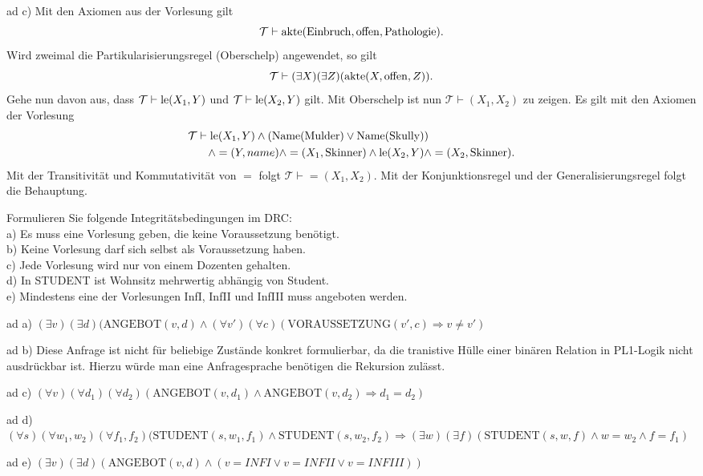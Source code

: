 \documentclass[12pt,a4paper]{amsart}
\begin{document}
\medskip

ad c) Mit den Axiomen aus der Vorlesung gilt
\[
\mathcal{T}\vdash \operatorname{akte}(\operatorname{Einbruch},\operatorname{offen},\operatorname{Pathologie}).
\]
Wird zweimal die Partikularisierungsregel (Oberschelp) angewendet, so gilt 
\[
\mathcal{T}\vdash(\exists X)(\exists Z)(\operatorname{akte}(X,\operatorname{offen},Z)).
\]
Gehe nun davon aus, dass $\mathcal{T}\vdash\operatorname{le}(X_1,Y)$ und $\mathcal{T}\vdash\operatorname{le}(X_2,Y)$ gilt. Mit Oberschelp ist nun $\mathcal{T}\vdash(X_1,X_2)$ zu zeigen.
Es gilt mit den Axiomen der Vorlesung
\begin{align*}
\mathcal{T} &\vdash \operatorname{le}(X_1,Y)\land(\operatorname{Name}(\operatorname{Mulder})\lor\operatorname{Name}(\operatorname{Skully}))\\
&\quad \land =(Y,name)\land =(X_1,\operatorname{Skinner})\land\operatorname{le}(X_2,Y)\land =(X_2,\operatorname{Skinner}).
\end{align*}
Mit der Transitivität und Kommutativität von $=$ folgt $\mathcal{T}\vdash=(X_1,X_2)$. Mit der Konjunktionsregel und der Generalisierungsregel folgt
die Behauptung.

\bigskip

\begin{aufgabe1}
Formulieren Sie folgende Integritätsbedingungen im DRC:\\
a) Es muss eine Vorlesung geben, die keine Voraussetzung benötigt.\\
b) Keine Vorlesung darf sich selbst als Voraussetzung haben.\\
c) Jede Vorlesung wird nur von einem Dozenten gehalten.\\
d) In STUDENT ist Wohnsitz mehrwertig abhängig von Student.\\
e) Mindestens eine der Vorlesungen InfI, InfII und InfIII muss angeboten werden.
\end{aufgabe1}

ad a) $(\exists v)(\exists d)(\mbox{ANGEBOT}(v,d)\land(\forall v')(\forall c)(\mbox{VORAUSSETZUNG}(v',c)\Rightarrow v\neq v')$\\

\medskip

ad b) Diese Anfrage ist nicht für beliebige Zustände konkret formulierbar, da die tranistive Hülle einer binären Relation in PL1-Logik nicht ausdrückbar ist. Hierzu würde man eine Anfragesprache benötigen die Rekursion zulässt.

\medskip

ad c) $(\forall v)(\forall d_1)(\forall d_2)(\mbox{ANGEBOT}(v,d_1)\land\mbox{ANGEBOT}(v,d_2)\Rightarrow d_1=d_2)$\\

\medskip

ad d) $(\forall s)(\forall w_1,w_2)(\forall f_1,f_2)(\mbox{STUDENT}(s,w_1,f_1)\land\mbox{STUDENT}(s,w_2,f_2)\Rightarrow(\exists w)(\exists f)(\mbox{STUDENT}(s,w,f)\land w=w_2\land f=f_1)$

\medskip

ad e) $(\exists v)(\exists d)(\mbox{ANGEBOT}(v,d)\land (v=INFI\lor v=INFII\lor v=INFIII))$
\end{document}
